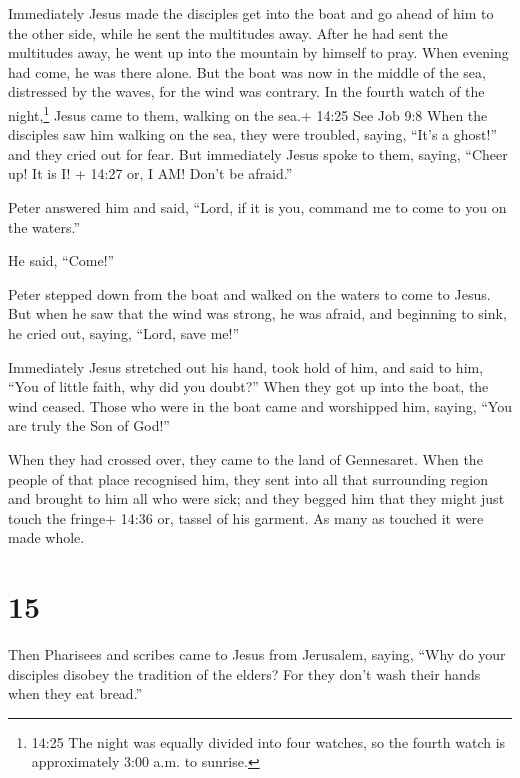  Immediately Jesus made the disciples get into the boat and
go ahead of him to the other side, while he sent the multitudes away.
 After he had sent the multitudes away, he went up into the
mountain by himself to pray. When evening had come, he was there alone.
 But the boat was now in the middle of the sea, distressed
by the waves, for the wind was contrary.  In the fourth
watch of the night,\footnote{14:25 The night was equally divided into
  four watches, so the fourth watch is approximately 3:00 a.m. to
  sunrise.} Jesus came to them, walking on the sea.+ 14:25 See Job 9:8
 When the disciples saw him walking on the sea, they were
troubled, saying, ``It's a ghost!'' and they cried out for fear.
 But immediately Jesus spoke to them, saying, ``Cheer up!
It is I! + 14:27 or, I AM! Don't be afraid.''

 Peter answered him and said, ``Lord, if it is you, command
me to come to you on the waters.''

 He said, ``Come!''

Peter stepped down from the boat and walked on the waters to come to
Jesus.  But when he saw that the wind was strong, he was
afraid, and beginning to sink, he cried out, saying, ``Lord, save me!''

 Immediately Jesus stretched out his hand, took hold of
him, and said to him, ``You of little faith, why did you doubt?''
 When they got up into the boat, the wind ceased.
 Those who were in the boat came and worshipped him,
saying, ``You are truly the Son of God!''

 When they had crossed over, they came to the land of
Gennesaret.  When the people of that place recognised him,
they sent into all that surrounding region and brought to him all who
were sick;  and they begged him that they might just touch
the fringe+ 14:36 or, tassel of his garment. As many as touched it were
made whole.

\hypertarget{section-14}{%
\section{15}\label{section-14}}

 Then Pharisees and scribes came to Jesus from Jerusalem,
saying,  ``Why do your disciples disobey the tradition of
the elders? For they don't wash their hands when they eat bread.''

